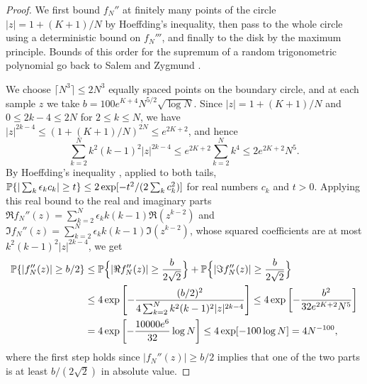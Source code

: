 \begin{proof}
We first bound $f_N''$ at finitely many points of the circle
$|z|=1+(K+1)/N$ by Hoeffding's inequality, then pass to the whole circle
using a deterministic bound on $f_N'''$, and finally to the disk by the
maximum principle.
Bounds of this order for the supremum of a random trigonometric
polynomial go back to Salem and Zygmund \cite[Chapter~6]{Kahane1985}.

We choose $\lceil N^3\rceil\le2N^3$ equally spaced points on the boundary
circle, and at each sample $z$ we take
$b=100e^{K+4}N^{5/2}\sqrt{\log N}$.
Since $|z|=1+(K+1)/N$ and $0\le2k-4\le2N$ for $2\le k\le N$, we have
$|z|^{2k-4}\le(1+(K+1)/N)^{2N}\le e^{2K+2}$, and hence
\[
 \sum_{k=2}^Nk^2(k-1)^2|z|^{2k-4}
 \le e^{2K+2}\sum_{k=2}^Nk^4\le2e^{2K+2}N^5.
\]
By Hoeffding's inequality \cite[Theorem~2]{Hoeffding1963}, applied to
both tails,
$\mathbb P\{|\sum_k\epsilon_kc_k|\ge t\}\le2\exp[-t^2/(2\sum_kc_k^2)]$ for real
numbers $c_k$ and $t>0$.
Applying this real bound to the real and imaginary parts
$\Re f_N''(z)=\sum_{k=2}^N\epsilon_kk(k-1)\Re(z^{k-2})$ and
$\Im f_N''(z)=\sum_{k=2}^N\epsilon_kk(k-1)\Im(z^{k-2})$, whose squared
coefficients are at most $k^2(k-1)^2|z|^{2k-4}$, we get
\begin{align*}
 \mathbb P\{|f_N''(z)|\ge b/2\}
 &\le\mathbb P\Bigl\{|\Re f_N''(z)|\ge\frac b{2\sqrt2}\Bigr\}
   +\mathbb P\Bigl\{|\Im f_N''(z)|\ge\frac b{2\sqrt2}\Bigr\}\\
 &\le4\exp\left[-\frac{(b/2)^2}
 {4\sum_{k=2}^Nk^2(k-1)^2|z|^{2k-4}}\right]
 \le4\exp\left[-\frac{b^2}{32e^{2K+2}N^5}\right]\\
 &=4\exp\left[-\frac{10000e^6}{32}\log N\right]
 \le4\exp[-100\log N]=4N^{-100},
\end{align*}
where the first step holds since $|f_N''(z)|\ge b/2$ implies that one of
the two parts is at least $b/(2\sqrt2)$ in absolute value.


\end{proof}
